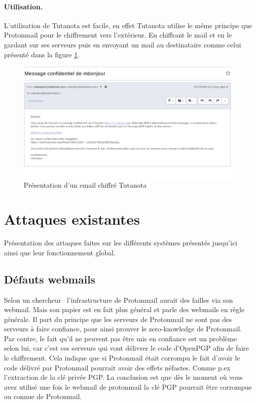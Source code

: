 \paragraph*{Utilisation.}
L'utilisation de Tutanota est facile, en effet Tutanota utilise le même principe que Protonmail pour le chiffrement vers l'extérieur. En chiffrant le mail et en le gardant sur ses serveurs puis en envoyant un mail au destinataire comme celui présenté dans la figure \ref{fig:TutanotaPres}.
\begin{figure}[h!]
	\includegraphics[width=14cm]{images/tutanotaPresentation.png}
	\centering
	\caption{Présentation d'un email chiffré Tutanota}
	\label{fig:TutanotaPres}
\end{figure}
\section{Attaques existantes}
Présentation des attaques faites sur les différents systèmes présentés jusqu'ici ainsi que leur fonctionnement global.
\subsection{Défauts webmails}
Selon un chercheur~\cite{DBLP:journals/iacr/Kobeissi18a} l'infrastructure de Protonmail aurait des failles via son webmail. Mais son papier est en fait plus général et parle des webmails en règle générale.
Il part du principe que les serveurs de Protonmail ne sont pas des serveurs à faire confiance, pour ainsi prouver le zero-knowledge de Protonmail. Par contre, le fait qu'il ne peuvent pas être mis en confiance est un problème selon lui, car c'est ces serveurs qui vont délivrer le code d'OpenPGP afin de faire le chiffrement. 
Cela indique que si Protonmail était corrompu le fait d'avoir le code délivré par Protonmail pourrait avoir des effets néfastes. Comme p.ex l'extraction de la clé privée PGP. La conclusion est que dès le moment où vous avez utilisé une fois le webmail de protonmail la clé PGP pourrait être corrompue ou connue de Protonmail.
